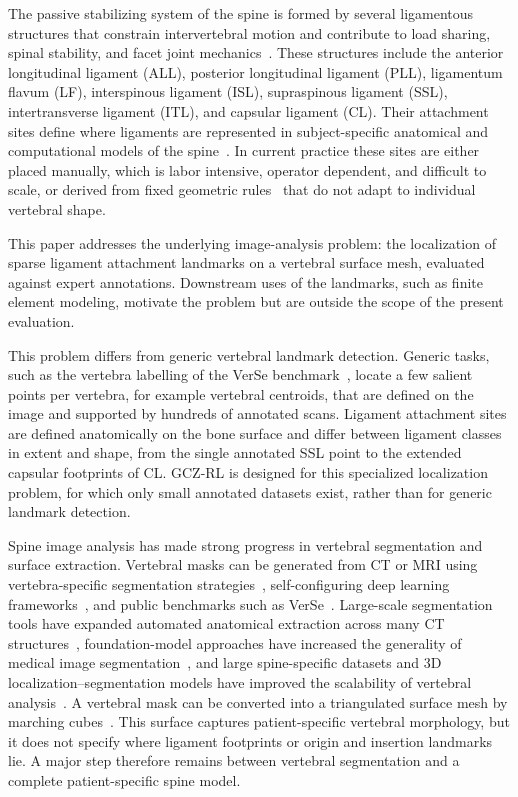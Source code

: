 \documentclass[5p,times,twocolumn,authoryear]{elsarticle}
\newif\ifhighlight
\newcommand{\revstart}{\ifhighlight\begingroup\color{revcolor}\fi}
\newcommand{\revend}{\ifhighlight\par\endgroup\fi}
\begin{document}
The passive stabilizing system of the spine is formed by several ligamentous structures that constrain intervertebral motion and contribute to load sharing, spinal stability, and facet joint mechanics~\citep{bogduk2012}. These structures include the anterior longitudinal ligament (ALL), posterior longitudinal ligament (PLL), ligamentum flavum (LF), interspinous ligament (ISL), supraspinous ligament (SSL), intertransverse ligament (ITL), and capsular ligament (CL). Their attachment sites define where ligaments are represented in subject-specific anatomical and computational models of the spine~\citep{ma2025posteriorligament,dreischarf2014,moramarco2010}. In current practice these sites are either placed manually, which is labor intensive, operator dependent, and difficult to scale, or derived from fixed geometric rules~\citep{ahmadi2025scirep,ahmadi2025worldneurosurgery,biswas2025sixligaments} that do not adapt to individual vertebral shape.

This paper addresses the underlying image-analysis problem: the localization of sparse ligament attachment landmarks on a vertebral surface mesh, evaluated against expert annotations. Downstream uses of the landmarks, such as finite element modeling, motivate the problem but are outside the scope of the present evaluation.

\revstart
This problem differs from generic vertebral landmark detection. Generic tasks, such as the vertebra labelling of the VerSe benchmark~\citep{sekuboyina2021}, locate a few salient points per vertebra, for example vertebral centroids, that are defined on the image and supported by hundreds of annotated scans. Ligament attachment sites are defined anatomically on the bone surface and differ between ligament classes in extent and shape, from the single annotated SSL point to the extended capsular footprints of CL. GCZ-RL is designed for this specialized localization problem, for which only small annotated datasets exist, rather than for generic landmark detection.
\revend

Spine image analysis has made strong progress in vertebral segmentation and surface extraction. Vertebral masks can be generated from CT or MRI using vertebra-specific segmentation strategies~\citep{lessmann2019}, self-configuring deep learning frameworks~\citep{isensee2021}, and public benchmarks such as VerSe~\citep{sekuboyina2021}. Large-scale segmentation tools have expanded automated anatomical extraction across many CT structures~\citep{wasserthal2023}, foundation-model approaches have increased the generality of medical image segmentation~\citep{ma2024medsam}, and large spine-specific datasets and 3D localization--segmentation models have improved the scalability of vertebral analysis~\citep{deng2025ctspine1k,lei2025medlsam}. A vertebral mask can be converted into a triangulated surface mesh by marching cubes~\citep{lorensen1987}. This surface captures patient-specific vertebral morphology, but it does not specify where ligament footprints or origin and insertion landmarks lie. A major step therefore remains between vertebral segmentation and a complete patient-specific spine model.
\end{document}

